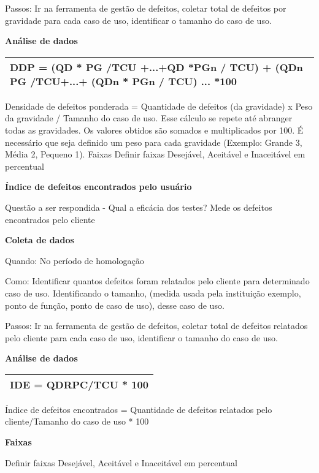 Passos: Ir na ferramenta de gestão de defeitos, coletar total de defeitos por gravidade para cada caso de uso, identificar o tamanho do caso de uso.

\textbf{Análise de dados}

\begin{table}[H]
\centering
\begin{tabular}{|p{130mm}|}
\hline
DDP = (QD * PG /TCU +...+QD *PGn / TCU) + (QDn PG /TCU+...+ (QDn * PGn / TCU) ... *100 \\ 
\hline
\end{tabular}
\end{table}

Densidade de defeitos ponderada = Quantidade de defeitos (da gravidade) x Peso da gravidade / Tamanho do caso de uso. Esse cálculo se repete até abranger todas as gravidades. Os valores obtidos são somados e multiplicados por 100. É necessário que seja definido um peso para cada gravidade (Exemplo: Grande 3, Média 2, Pequeno 1). Faixas Definir faixas Desejável, Aceitável e Inaceitável em percentual

\textbf{Índice de defeitos encontrados pelo usuário}

Questão a ser respondida - Qual a eficácia dos testes? Mede os defeitos encontrados pelo cliente

\textbf{Coleta de dados}

Quando: No período de homologação 

Como: Identificar quantos defeitos foram relatados pelo cliente para determinado caso de uso. Identificando o tamanho, (medida usada pela instituição exemplo, ponto de função, ponto de caso de uso), desse caso de uso. 

Passos: Ir na ferramenta de gestão de defeitos, coletar total de defeitos relatados pelo cliente para cada caso de uso, identificar o tamanho do caso de uso.



\textbf{Análise de dados}

\begin{tabular}{|l|}
\hline
IDE = QDRPC/TCU * 100 \\ 
\hline
\end{tabular}

Índice de defeitos encontrados = Quantidade de defeitos relatados pelo cliente/Tamanho do caso de uso * 100

\textbf{Faixas}

Definir faixas Desejável, Aceitável e Inaceitável em percentual

